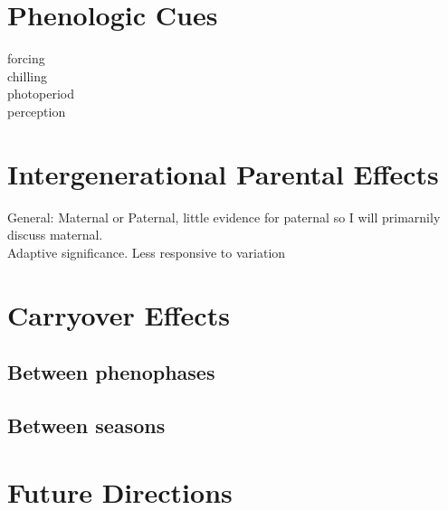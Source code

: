 \documentclass{article}\usepackage[]{graphicx}\usepackage[]{color}
\begin{document}
\section{Phenologic Cues}
forcing\\
chilling\\
photoperiod\\
perception\\
\section{Intergenerational Parental Effects}
General: Maternal or Paternal, little evidence for paternal so I will primarnily discuss maternal.\\
Adaptive significance. Less responsive to variation\\
\section{Carryover Effects}
\subsection{Between phenophases}
\subsection{Between seasons}
\section{Future Directions}
\end{document}

